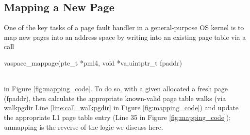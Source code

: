 \subsection{Mapping a New Page}
\label{sec:mapnew}
One of the key tasks of a page fault handler in a general-purpose OS kernel is
to map new pages into an address space by writing into an existing page table via a call\\
\centerline{\textsf{vaspace\_mappage(pte\_t *pml4, void *va,uintptr\_t fpaddr)}}\\
in Figure \ref{fig:mapping_code}.
To do so, with a given allocated a fresh page (\textsf{fpaddr}), then calculate the appropriate
known-valid page table walks (via \textsf{walkpgdir} Line \ref{line:call_walkpgdir} in Figure \ref{fig:mapping_code})  and update 
the appropriate L1 page table entry (Line 35 in Figure \ref{fig:mapping_code});
unmapping is the reverse of the logic we discuss here.
